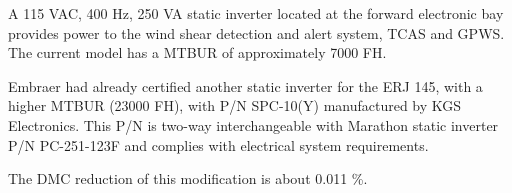 ﻿%
A 115 VAC, 400 Hz, 250 VA static inverter located at the forward electronic bay provides power to the wind shear detection and alert system, TCAS and GPWS. The current model has a MTBUR of approximately 7000 FH.

Embraer had already certified another static inverter for the ERJ 145, with a higher MTBUR (23000 FH), with P/N SPC-10(Y) manufactured by KGS Electronics. This P/N is two-way interchangeable with Marathon static inverter P/N PC-251-123F and complies with electrical system requirements.

The DMC reduction of this modification is about 0.011 \%.
